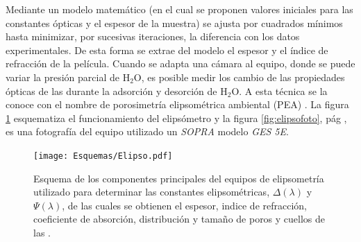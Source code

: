 		Mediante un modelo matemático (en el cual se proponen valores iniciales para las constantes ópticas y el espesor de la muestra) se ajusta por cuadrados mínimos hasta minimizar, por sucesivas iteraciones, la diferencia con los datos experimentales. De esta forma se extrae del modelo el espesor y el índice de refracción de la película. Cuando se adapta una cámara al equipo, donde se puede variar la presión parcial de H$_2$O, es posible medir los cambio de las propiedades ópticas de las \pdm durante la adsorción y desorción de H$_2$O. A esta técnica se la conoce con el nombre de porosimetría elipsométrica ambiental (PEA) \cite{Boissiere2005}. La figura \ref{fig:elipso} esquematiza el funcionamiento del elipsómetro y la figura \ref{fig:elipsofoto}, pág \pageref{fig:elipsofoto}, es una fotografía del equipo utilizado un \textit{SOPRA} modelo \textit{GES 5E}. 

			  \begin{figure}[t]
				\begin{center}
				\texttt{[image: Esquemas/Elipso.pdf]}
			  	\caption[Esquema de la técncia de elipsoporosimetría ambiental]{Esquema de los componentes principales del equipos de elipsometría utilizado para determinar las constantes elipsométricas, $\Delta(\lambda)$ y $\Psi(\lambda)$, de las cuales se obtienen el espesor, indice de refracción, coeficiente de absorción, distribución y tamaño de poros y cuellos de las \pdm.}
			  	\label{fig:elipso}
			  	\end{center}
			  	\end{figure}
		
